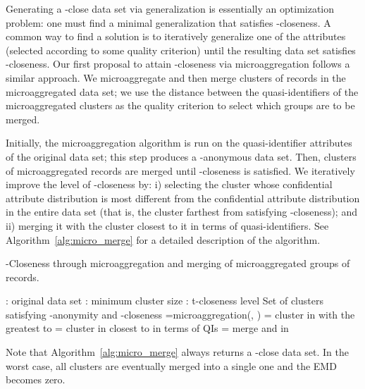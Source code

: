 \documentclass[10pt,journal,compsoc]{IEEEtran}
\theoremstyle{definition}
\theoremstyle{plain}
\begin{document}
Generating a -close data set via generalization is essentially
an optimization problem: one must find a minimal generalization 
that satisfies -closeness.
A common way to find a solution is to iteratively
generalize one of the attributes (selected according to some quality
criterion) until the resulting data set satisfies -closeness. Our 
first proposal to attain -closeness via microaggregation follows
a similar approach. We microaggregate and then 
merge clusters of records in the microaggregated data set;
we use the distance between the quasi-identifiers of the
microaggregated clusters as the quality criterion
to select which groups are to be merged.  

Initially, the microaggregation algorithm is run on the quasi-identifier
attributes of the original data set; this step produces a -anonymous
data set. Then, clusters of microaggregated records are merged until
-closeness is satisfied. We iteratively improve the level of -closeness
by: i) selecting the cluster whose confidential attribute 
distribution is most different from the confidential
attribute distribution in the entire data set (that is,
the cluster farthest from 
satisfying -closeness); and ii) merging it with the cluster 
closest to it in terms of quasi-identifiers. 
See Algorithm~\ref{alg:micro_merge}
for a detailed description of the algorithm.

\begin{algorithm}
	\protect\caption{\label{alg:micro_merge}-Closeness through microaggregation and
		merging of microaggregated groups of records.}
		
	\begin{algorithmic}[0]
		 : original data set
		\State \hspace{1.11cm}: minimum cluster size
		\State \hspace{1.11cm}: t-closeness level
		 Set of clusters satisfying -anonymity and -closeness
		\vspace{0.3cm}
		\State =microaggregation(, )\;
		\While{}
			\State = cluster in  with the greatest  to 
			\State = cluster in  closest to  in terms of QIs
			\State = merge  and  in 
		\EndWhile\label{f}
		 \;
	\end{algorithmic}
	

\end{algorithm}

Note that Algorithm~\ref{alg:micro_merge} always returns a -close
data set. In the worst case, all clusters are eventually 
merged into a single one and the EMD becomes zero.
\end{document}
